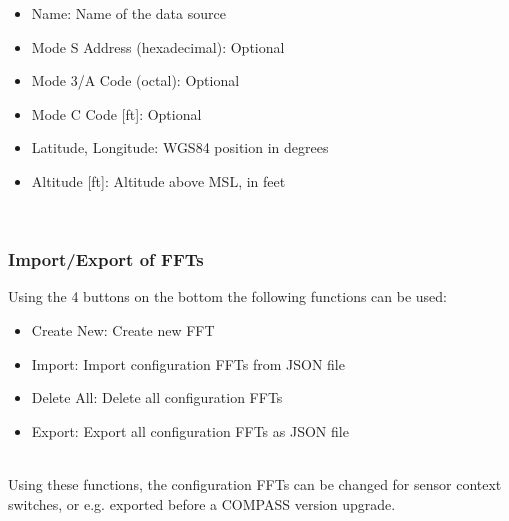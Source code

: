 \begin{itemize}
\item Name: Name of the data source
\item Mode S Address (hexadecimal): Optional
\item Mode 3/A Code (octal): Optional
\item Mode C Code [ft]: Optional
\item Latitude, Longitude: WGS84 position in degrees
\item Altitude [ft]: Altitude above MSL, in feet
\end{itemize}
\ \\

\subsubsection{Import/Export of FFTs}
\label{sec:config_fft_export}

Using the 4 buttons on the bottom the following functions can be used:

\begin{itemize}
\item Create New: Create new FFT
\item Import: Import configuration FFTs from JSON file
\item Delete All: Delete all configuration FFTs
\item Export: Export all configuration FFTs as JSON file
\end{itemize}
\ \\

Using these functions, the configuration FFTs can be changed for sensor context switches, or e.g. exported before a COMPASS version upgrade.
